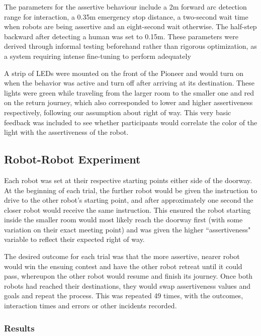 \documentclass[letterpaper, 10 pt, conference]{ieeeconf}  %
\begin{document}
The parameters for the assertive behaviour include a 2m forward arc detection range for interaction, a 0.35m emergency stop distance, a two-second wait time when robots are being assertive and an eight-second wait otherwise. The half-step backward after detecting a human was set to 0.15m. These parameters were derived through informal testing beforehand rather than rigorous optimization, as a system requiring intense fine-tuning to perform adequately

A strip of LEDs were mounted on the front of the Pioneer and would turn on when the behavior was active and turn off after arriving at its destination. These lights were green while traveling from the larger room to the smaller one and red on the return journey, which also corresponded to lower and higher assertiveness respectively, following our assumption about right of way. This very basic feedback was included to see whether participants would correlate the color of the light with the assertiveness of the robot.

\subsection{Robot-Robot Experiment}

Each robot was set at their respective starting points either side of the doorway. At the beginning of each trial, the further robot would be given the instruction to drive to the other robot’s starting point, and after approximately one second the closer robot would receive the same instruction. This ensured the robot starting inside the smaller room would most likely reach the doorway first (with some variation on their exact meeting point) and was given the higher ``assertiveness" variable to reflect their expected right of way.

The desired outcome for each trial was that the more assertive, nearer robot would win the ensuing contest and have the other robot retreat until it could pass, whereupon the other robot would resume and finish its journey. Once both robots had reached their destinations, they would swap assertiveness values and goals and repeat the process. This was repeated 49 times, with the outcomes, interaction times and errors or other incidents recorded. 

\subsubsection{Results}
\end{document}
